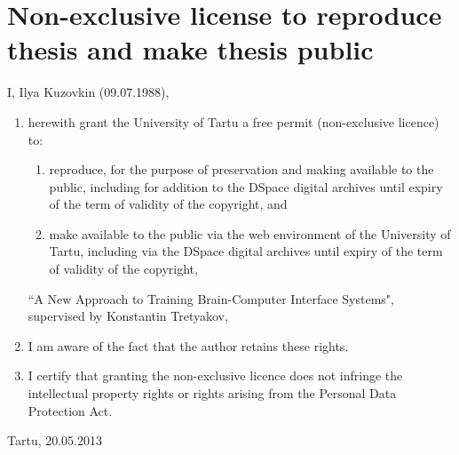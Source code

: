 \documentclass[a4paper,12pt]{report}
\theoremstyle{definition}
\begin{document}
%
%
\section*{Non-exclusive license to reproduce thesis and make thesis public}
I, Ilya Kuzovkin (09.07.1988), 
\begin{enumerate}
	\item herewith grant the University of Tartu a free permit (non-exclusive licence) to:
	\begin{enumerate}[label*=\arabic*.]
		\renewcommand{\theenumi}{\arabic{enumi}}
		\item reproduce, for the purpose of preservation and making available to the public, including for addition to the DSpace digital archives until expiry of the term of validity of the copyright, and
		\item make available to the public via the web environment of the University of Tartu, including via the DSpace digital archives until expiry of the term of validity of the copyright,
	\end{enumerate}
	``A New Approach to Training Brain-Computer Interface Systems", supervised by Konstantin Tretyakov,
	
	\item I am aware of the fact that the author retains these rights.

	\item I certify that granting the non-exclusive licence does not infringe the intellectual property rights or rights arising from the Personal Data Protection Act. 
\end{enumerate}

Tartu, 20.05.2013

\thispagestyle{empty}
\newpage
\end{document}

